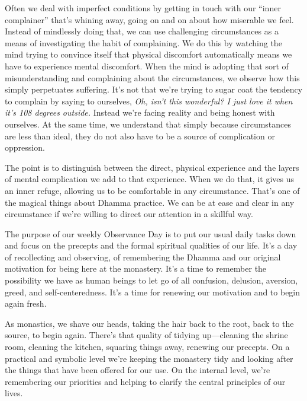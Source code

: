 Often we deal with imperfect conditions by getting in touch with our 
``inner complainer'' that's whining away, going on and on about how 
miserable we feel. Instead of mindlessly doing that, we can use 
challenging circumstances as a means of investigating the habit of 
complaining. We do this by watching the mind trying to convince itself 
that physical discomfort automatically means we have to experience 
mental discomfort. When the mind is adopting that sort of 
misunderstanding and complaining about the circumstances, we observe 
how this simply perpetuates suffering. It's not that we're trying to 
sugar coat the tendency to complain by saying to ourselves, \emph{Oh, 
isn't this wonderful? I just love it when it's 108 degrees outside.} 
Instead we're facing reality and being honest with ourselves. At the 
same time, we understand that simply because circumstances are less 
than ideal, they do not also have to be a source of complication or 
oppression.

The point is to distinguish between the direct, physical experience and 
the layers of mental complication we add to that experience. When we do 
that, it gives us an inner refuge, allowing us to be comfortable in any 
circumstance. That's one of the magical things about Dhamma practice. 
We can be at ease and clear in any circumstance if we're willing to 
direct our attention in a skillful way.


The purpose of our weekly Observance Day is to put our usual daily 
tasks down and focus on the precepts and the formal spiritual qualities 
of our life. It's a day of recollecting and observing, of remembering 
the Dhamma and our original motivation for being here at the monastery. 
It's a time to remember the possibility we have as human beings to let 
go of all confusion, delusion, aversion, greed, and self-centeredness. 
It's a time for renewing our motivation and to begin again fresh.

As monastics, we shave our heads, taking the hair back to the root, 
back to the source, to begin again. There's that quality of tidying 
up---cleaning the shrine room, cleaning the kitchen, squaring things 
away, renewing our precepts. On a practical and symbolic level we're 
keeping the monastery tidy and looking after the things that have been 
offered for our use. On the internal level, we're remembering our 
priorities and helping to clarify the central principles of our lives.

